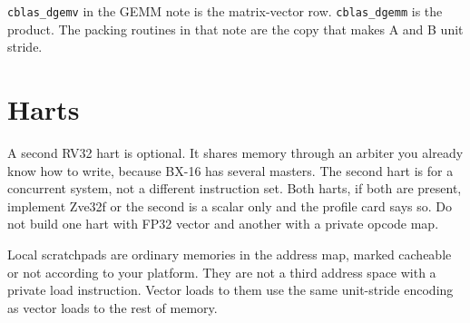 \texttt{cblas\_dgemv} in the GEMM note is the matrix-vector row. \texttt{cblas\_dgemm} is the product. The packing routines in that note are the copy that makes A and B unit stride.













\section{Harts}

A second RV32 hart is optional. It shares memory through an arbiter you already know how to write, because BX-16 has several masters. The second hart is for a concurrent system, not a different instruction set. Both harts, if both are present, implement Zve32f or the second is a scalar only and the profile card says so. Do not build one hart with FP32 vector and another with a private opcode map.

Local scratchpads are ordinary memories in the address map, marked cacheable or not according to your platform. They are not a third address space with a private load instruction. Vector loads to them use the same unit-stride encoding as vector loads to the rest of memory.
